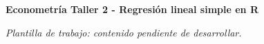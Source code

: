 \documentclass{article}
\begin{document}
{\LARGE\bfseries\color{azul}Econometría Taller 2 - Regresión lineal simple en R\par}
\vspace{1em}
\textit{Plantilla de trabajo: contenido pendiente de desarrollar.}
\end{document}
